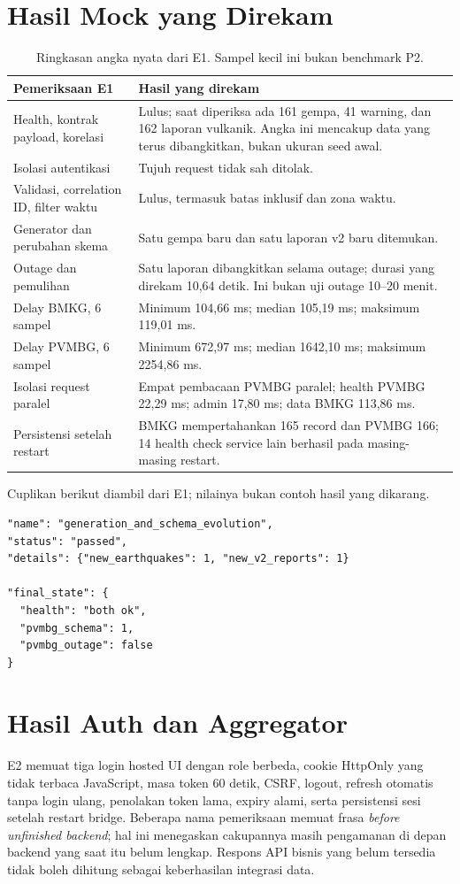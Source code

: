 \section{Hasil Mock yang Direkam}
\begin{table}[H]\small
\begin{tabularx}{\textwidth}{@{}P{5.3cm}Y@{}}
\toprule \textbf{Pemeriksaan E1} & \textbf{Hasil yang direkam}\\\midrule
Health, kontrak payload, korelasi & Lulus; saat diperiksa ada 161 gempa, 41 warning, dan 162 laporan vulkanik. Angka ini mencakup data yang terus dibangkitkan, bukan ukuran seed awal.\\
Isolasi autentikasi & Tujuh request tidak sah ditolak.\\
Validasi, correlation ID, filter waktu & Lulus, termasuk batas  inklusif dan zona waktu.\\
Generator dan perubahan skema & Satu gempa baru dan satu laporan v2 baru ditemukan.\\
Outage dan pemulihan & Satu laporan dibangkitkan selama outage; durasi yang direkam 10,64 detik. Ini bukan uji outage 10--20 menit.\\
Delay BMKG, 6 sampel & Minimum 104,66 ms; median 105,19 ms; maksimum 119,01 ms.\\
Delay PVMBG, 6 sampel & Minimum 672,97 ms; median 1642,10 ms; maksimum 2254,86 ms.\\
Isolasi request paralel & Empat pembacaan PVMBG paralel; health PVMBG 22,29 ms; admin 17,80 ms; data BMKG 113,86 ms.\\
Persistensi setelah restart & BMKG mempertahankan 165 record dan PVMBG 166; 14 health check service lain berhasil pada masing-masing restart.\\\bottomrule
\end{tabularx}
\caption{Ringkasan angka nyata dari E1. Sampel kecil ini bukan benchmark P2.}
\end{table}

Cuplikan berikut diambil dari E1; nilainya bukan contoh hasil yang dikarang.
\begin{lstlisting}
"name": "generation_and_schema_evolution",
"status": "passed",
"details": {"new_earthquakes": 1, "new_v2_reports": 1}

"final_state": {
  "health": "both ok",
  "pvmbg_schema": 1,
  "pvmbg_outage": false
}
\end{lstlisting}

\section{Hasil Auth dan Aggregator}
E2 memuat tiga login hosted UI dengan role berbeda, cookie HttpOnly yang tidak terbaca JavaScript, masa token 60 detik, CSRF, logout, refresh otomatis tanpa login ulang, penolakan token lama, expiry alami, serta persistensi sesi setelah restart bridge. Beberapa nama pemeriksaan memuat frasa \emph{before unfinished backend}; hal ini menegaskan cakupannya masih pengamanan di depan backend yang saat itu belum lengkap. Respons API bisnis yang belum tersedia tidak boleh dihitung sebagai keberhasilan integrasi data.

